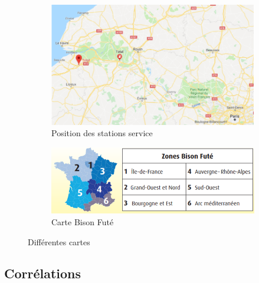 \documentclass{article} %
\begin{document}
\begin{figure}[!h]
	\centering
	\begin{subfigure}{0.5\textwidth}
		\centering
		\includegraphics[keepaspectratio = true,scale=0.45]{maps.png}
		\caption{Position des stations service}
		\label{fig:maps}
	\end{subfigure}%
	\begin{subfigure}{0.5\textwidth}
		\centering
		\includegraphics[keepaspectratio = true,scale=0.45]{bison.png}
		\caption{Carte Bison Futé}
		\label{fig:bison}
	\end{subfigure}
	\caption{Différentes cartes}
\end{figure}

\subsection{Corrélations}
\end{document}
